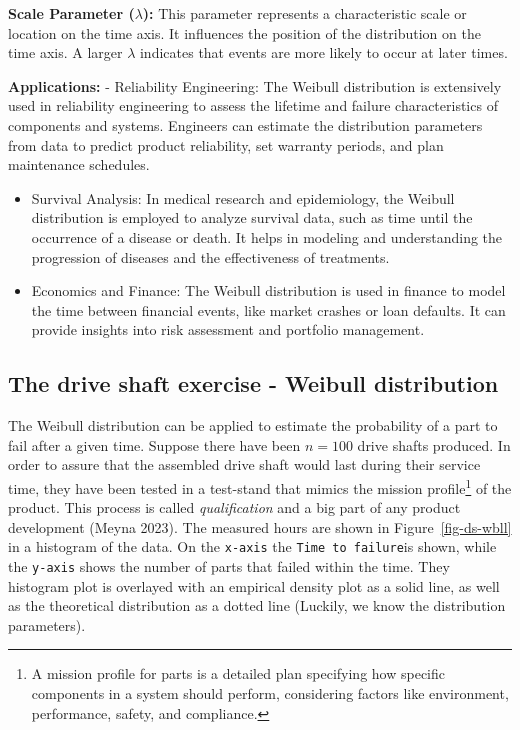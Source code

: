 \documentclass[
  a4paper,
]{scrbook}
\begin{document}
\textbf{Scale Parameter (\(\lambda\)):} This parameter represents a
characteristic scale or location on the time axis. It influences the
position of the distribution on the time axis. A larger \(\lambda\)
indicates that events are more likely to occur at later times.

\textbf{Applications:} - Reliability Engineering: The Weibull
distribution is extensively used in reliability engineering to assess
the lifetime and failure characteristics of components and systems.
Engineers can estimate the distribution parameters from data to predict
product reliability, set warranty periods, and plan maintenance
schedules.

\begin{itemize}
\item
  Survival Analysis: In medical research and epidemiology, the Weibull
  distribution is employed to analyze survival data, such as time until
  the occurrence of a disease or death. It helps in modeling and
  understanding the progression of diseases and the effectiveness of
  treatments.
\item
  Economics and Finance: The Weibull distribution is used in finance to
  model the time between financial events, like market crashes or loan
  defaults. It can provide insights into risk assessment and portfolio
  management.
\end{itemize}

\subsection{The drive shaft exercise - Weibull
distribution}\label{the-drive-shaft-exercise---weibull-distribution}

The Weibull distribution can be applied to estimate the probability of a
part to fail after a given time. Suppose there have been \(n=100\) drive
shafts produced. In order to assure that the assembled drive shaft would
last during their service time, they have been tested in a test-stand
that mimics the mission profile\footnote{A mission profile for parts is
  a detailed plan specifying how specific components in a system should
  perform, considering factors like environment, performance, safety,
  and compliance.} of the product. This process is called
\emph{qualification} and a big part of any product development (Meyna
2023). The measured hours are shown in Figure~\ref{fig-ds-wbll} in a
histogram of the data. On the \texttt{x-axis} the
\texttt{Time\ to\ failure}is shown, while the \texttt{y-axis} shows the
number of parts that failed within the time. They histogram plot is
overlayed with an empirical density plot as a solid line, as well as the
theoretical distribution as a dotted line (Luckily, we know the
distribution parameters).
\end{document}
